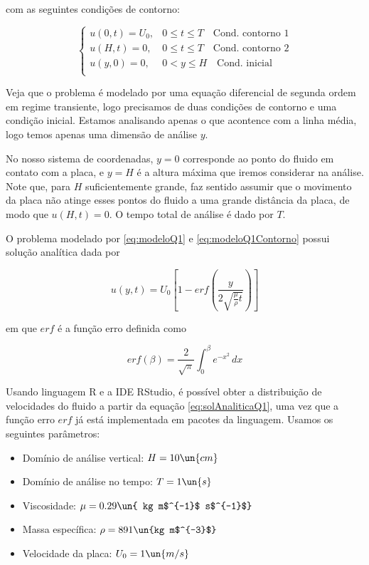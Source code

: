 \noindent com as seguintes condições de contorno:

\begin{equation}\label{eq:modeloQ1Contorno}
    \begin{cases}
        u(0, t) = U_0, & 0 \leq t \leq T \quad \textrm{Cond. contorno 1}\\
        u(H, t) = 0,   & 0 \leq t \leq T \quad \textrm{Cond. contorno 2}\\
        u(y, 0) =  0,  & 0 < y \leq H \quad \textrm{Cond. inicial}     \\
    \end{cases}
\end{equation}

Veja que o problema é modelado por uma equação diferencial de segunda ordem
em regime transiente, logo precisamos de duas condições de contorno e uma condição
inicial. Estamos analisando apenas o que acontence com a linha média, logo temos 
apenas uma dimensão de análise $y$.

No nosso sistema de coordenadas, $y = 0$ corresponde ao ponto do fluido
em contato com a placa, e $y = H$ é a altura máxima que iremos considerar na análise.
Note que, para $H$ suficientemente grande, faz sentido assumir que o movimento da placa
não atinge esses pontos do fluido a uma grande distância da placa, de modo que
$u(H, t) = 0$. O tempo total de análise é dado por $T$.

O problema modelado por \eqref{eq:modeloQ1} e \eqref{eq:modeloQ1Contorno} possui solução analítica dada por

\begin{equation}\label{eq:solAnaliticaQ1}
    u(y,t) = U_0 \left[1 - erf\left(\frac{y}{2\sqrt{\frac{\mu}{\rho}t}}\right)\right]
\end{equation}

\noindent em que $erf$ é a função erro definida como

\begin{equation}\label{eq:erf}
    erf(\beta) = \frac{2}{\sqrt{\pi}} \int_0^\beta e^{-x^2} \, dx
\end{equation}

Usando linguagem R e a IDE RStudio,
é possível obter a distribuição de velocidades do fluido
a partir da equação \eqref{eq:solAnaliticaQ1}, uma vez que a função erro $erf$
já está implementada em pacotes da linguagem. Usamos os seguintes parâmetros:

\begin{itemize}
    \item Domínio de análise vertical: $H=10 \un{cm}$
    \item Domínio de análise no tempo: $T=1 \un{s}$
    \item Viscosidade: $\mu=0.29 \un{ kg m$^{-1}$ s$^{-1}$}$
    \item Massa específica: $\rho=891 \un{kg m$^{-3}$}$
    \item Velocidade da placa: $U_0 = 1 \un{m/s}$
\end{itemize}

